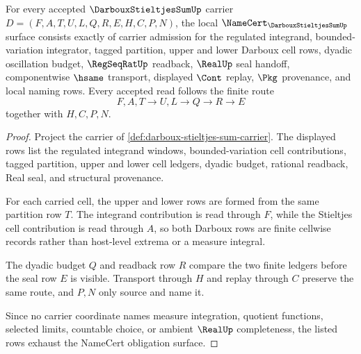 \begin{theorem}
\label{thm:darboux-stieltjes-sum-namecert-obligations}
For every accepted $\DarbouxStieltjesSumUp$ carrier $D=(F,A,T,U,L,Q,R,E,H,C,P,N)$, the local $\NameCert_{\DarbouxStieltjesSumUp}$ surface consists exactly of carrier admission for the regulated integrand, bounded-variation integrator, tagged partition, upper and lower Darboux cell rows, dyadic oscillation budget, $\RegSeqRatUp$ readback, $\RealUp$ seal handoff, componentwise $\hsame$ transport, displayed $\Cont$ replay, $\Pkg$ provenance, and local naming rows. Every accepted read follows the finite route
$$
F,A,T \longrightarrow U,L \longrightarrow Q \longrightarrow R \longrightarrow E
$$
together with $H,C,P,N$.
\end{theorem}
\begin{proof}
Project the carrier of \autoref{def:darboux-stieltjes-sum-carrier}. The displayed rows list the regulated integrand windows, bounded-variation cell contributions, tagged partition, upper and lower cell ledgers, dyadic budget, rational readback, Real seal, and structural provenance.

For each carried cell, the upper and lower rows are formed from the same partition row $T$. The integrand contribution is read through $F$, while the Stieltjes cell contribution is read through $A$, so both Darboux rows are finite cellwise records rather than host-level extrema or a measure integral.

The dyadic budget $Q$ and readback row $R$ compare the two finite ledgers before the seal row $E$ is visible. Transport through $H$ and replay through $C$ preserve the same route, and $P,N$ only source and name it.

Since no carrier coordinate names measure integration, quotient functions, selected limits, countable choice, or ambient $\RealUp$ completeness, the listed rows exhaust the NameCert obligation surface.
\end{proof}

